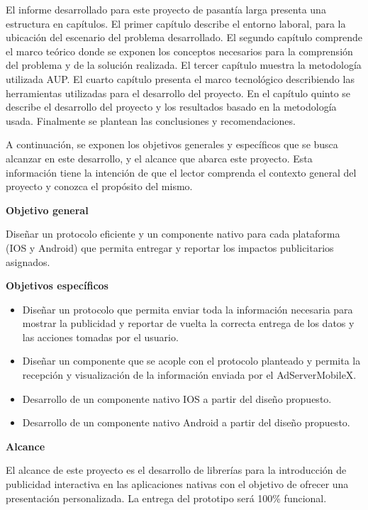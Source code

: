 El informe desarrollado para este proyecto de pasantía larga presenta
una estructura en capítulos. El primer capítulo describe el entorno
laboral, para la ubicación del escenario del problema desarrollado.
El segundo capítulo comprende el marco teórico donde se exponen los
conceptos necesarios para la comprensión del problema y de la solución
realizada. El tercer capítulo muestra la metodología utilizada AUP.
El cuarto capítulo presenta el marco tecnológico describiendo las
herramientas utilizadas para el desarrollo del proyecto. En el capítulo
quinto se describe el desarrollo del proyecto y los resultados basado
en la metodología usada. Finalmente se plantean las conclusiones y
recomendaciones.

A continuación, se exponen los objetivos generales y específicos que
se busca alcanzar en este desarrollo, y el alcance que abarca este
proyecto. Esta información tiene la intención de que el lector comprenda
el contexto general del proyecto y conozca el propósito del mismo.

\vspace{7.5pt}


\noindent \textbf{Objetivo general}\vspace{7.5pt}


Diseñar un protocolo eficiente y un componente nativo para cada plataforma
(IOS y Android) que permita entregar y reportar los impactos publicitarios
asignados.\vspace{7.5pt}


\noindent \textbf{Objetivos específicos}\vspace{7.5pt}

\begin{itemize}
\item Diseñar un protocolo que permita enviar toda la información necesaria
para mostrar la publicidad y reportar de vuelta la correcta entrega
de los datos y las acciones tomadas por el usuario.
\item Diseñar un componente que se acople con el protocolo planteado y permita
la recepción y visualización de la información enviada por el AdServerMobileX.
\item Desarrollo de un componente nativo IOS a partir del diseño propuesto.
\item Desarrollo de un componente nativo Android a partir del diseño propuesto.
\end{itemize}
\vspace{7.5pt}


\noindent \textbf{Alcance}

\vspace{7.5pt}


El alcance de este proyecto es el desarrollo de librerías para la
introducción de publicidad interactiva en las aplicaciones nativas
con el objetivo de ofrecer una presentación personalizada. La entrega
del prototipo será 100\% funcional.

%
\pagebreak{}%

